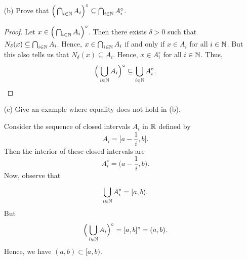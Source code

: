 \documentclass[a4paper]{article}
\begin{document}
\begin{enumerate}
\begin{enumerate}
\begin{proof}
           With (2), let \( x \in \bigcap_{ i=1 }^{ n } {A}_{i}^{\circ} \). Then for all \( 1 \leq i \leq n  \), we have \( x \in {A}_{i}^{\circ} \). By definition, there exists \( \delta > 0  \) such that \( {N}_{\epsilon}(x) \subseteq {A}_{i} \) for all \( 1 \leq i \leq n \). Thus, \( x \in {A}_{i} \) for all \( 1 \leq i \leq n \) and so                    
           \[  x \in \bigcap_{ i=1 }^{ n } {A}_{i}. \]
          Subsequently, \( {N}_{\delta}(x) \subseteq \bigcap_{ i=1 }^{ n } {A}_{i} \) and so \( x \in \Big(  \bigcap_{ i=1 }^{ n } {A}_{i} \Big)^{\circ} \). Therefore, we have 
          \[  \bigcap_{ i=1 }^{ n }  {A}_{i}^{\circ} \subseteq \Big(  \bigcap_{ i=1 }^{ n } {A}_{i} \Big)^{\circ}.  \]
          Hence, (1) and (2) gives us our desired result.
       \end{proof}
                \item[(b)] Prove that \( \Big(  \bigcap_{ i \in \mathbb{N}  }^{   }  {A}_{i} \Big)^{\circ} \subseteq \bigcap_{ i \in \mathbb{N}  }^{  } {A}_{i}^{\circ} \).
                    \begin{proof}
                    Let \( x \in \Big(  \bigcap_{ i \in \mathbb{N}  }^{  }  {A}_{i} \Big)^{\circ} \). Then there exists \( \delta > 0  \) such that \( {N}_{\delta}(x) \subseteq \bigcap_{ i \in \mathbb{N}  }^{  }  {A}_{i} \). Hence, \( x \in \bigcap_{ i \in \mathbb{N} }^{   } {A}_{i} \) if and only if \( x \in {A}_{i} \) for all \( i \in \mathbb{N} \). But this also tells us that \( {N}_{\delta}(x) \subseteq {A}_{i} \). Hence, \( x \in {A}_{i}^{\circ} \) for all \( i \in \mathbb{N} \). Thus,   
                    \[  \Big(  \bigcup_{ i \in \mathbb{N}  }^{  } {A}_{i} \Big)^{\circ} \subseteq  \bigcup_{ i \in \mathbb{N}  }^{  }  {A}_{i}^{\circ}. \]
                    \end{proof}
                \item[(c)] Give an example where equality does not hold in (b).
                    \begin{solution}
                    Consider the sequence of closed intervals \( {A}_{i}  \) in \( \mathbb{R}  \) defined by 
                    \[  {A}_{i} = \Big[ a - \frac{ 1 }{ i } , b\Big]. \]
                    Then the interior of these closed intervals are
                    \[  {A}_{i}^{\circ} = \Big(  a - \frac{ 1 }{ i } , b \Big). \]
                    Now, observe that
                    \[  \bigcup_{ i \in \mathbb{N}  }^{  }  {A}_{i}^{\circ} = [a,b). \]
                    But 
                    \[  \Big(  \bigcup_{ i \in \mathbb{N}  }^{  } {A}_{i} \Big)^{\circ} = [a,b]^{\circ} = (a,b). \]
                    Hence, we have \( (a,b) \subset [a,b) \).

\end{solution}
\end{enumerate}
\end{enumerate}
\end{document}
